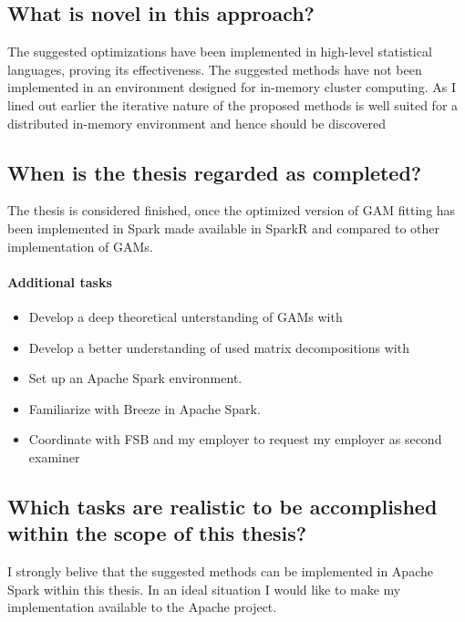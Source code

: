 \documentclass{article}
\begin{document}
    \subsection{What is novel in this approach?}
    The suggested optimizations have been implemented in high-level statistical languages, proving its effectiveness. The suggested methods have not been implemented in an environment designed for in-memory cluster computing. As I lined out earlier the iterative nature of the proposed methods is well suited for a distributed in-memory environment and hence should be discovered

    \subsection{When is the thesis regarded as completed?}
    The thesis is considered finished, once the optimized version of GAM fitting has been implemented in Spark made available in SparkR and compared to other implementation of GAMs.

    \paragraph{Additional tasks}
        \begin{itemize}
            \item Develop a deep theoretical unterstanding of GAMs with \cite{gamBook}
            \item Develop a better understanding of used matrix decompositions with \cite{strang09}
            \item Set up an Apache Spark environment.
            \item Familiarize with Breeze in Apache Spark.
            \item Coordinate with FSB and my employer to request my employer as second examiner
        \end{itemize}

    \subsection{Which tasks are realistic to be accomplished within the scope of this thesis?}
    I strongly belive that the suggested methods can be implemented in Apache Spark within this thesis. In an ideal situation I would like to make my implementation available to the Apache project.
\end{document}

